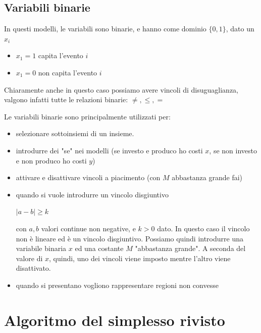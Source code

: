 \documentclass[11pt, oneside]{article}   	%
\begin{document}
\subsection{Variabili binarie}
In questi modelli, le variabili sono binarie, e hanno come dominio $\{0, 1\}$, dato un $x_i$ \begin{itemize}
\item $x_1 = 1$ capita l'evento $i$
\item $x_1 = 0$ non capita l'evento $i$
\end{itemize}
Chiaramente anche in questo caso possiamo avere vincoli di disuguaglianza, valgono infatti tutte le relazioni binarie: $\neq, \leq, =$

Le variabili binarie sono principalmente utilizzati per:
\begin{itemize}
\item selezionare sottoinsiemi di un insieme.
\item introdurre dei "se" nei modelli (se investo e produco ho costi $x$, se non investo e non produco ho costi $y$)
\item attivare e disattivare vincoli a piacimento (con $M$ abbastanza grande fai)
\item quando si vuole introdurre un vincolo disgiuntivo
\begin{center}
$|a - b| \geq k$
\end{center}
con $a, b$ valori continue non negative, e $k > 0$ dato.
In questo caso il vincolo non è lineare ed è un vincolo disgiuntivo. Possiamo quindi introdurre una variabile binaria $x$ ed una costante $M$ "abbastanza grande".
A seconda del valore di $x$, quindi, uno dei vincoli viene imposto mentre l'altro viene disattivato.
\item quando si presentano vogliono rappresentare regioni non convesse

\end{itemize}

\section{Algoritmo del simplesso rivisto}


\end{document}
